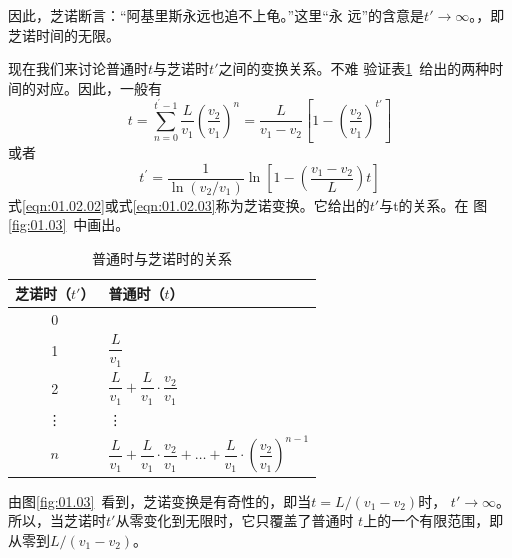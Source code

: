 因此，芝诺断言：“阿基里斯永远也追不上龟。”这里“永
远”的含意是$t'\rightarrow\infty$。，即芝诺时间的无限。

现在我们来讨论普通时$t$与芝诺时$t'$之间的变换关系。不难
验证表\ref{tab:01.02}~给出的两种时间的对应。因此，一般有
{\setlength{\mathindent}{5em}
\begin{equation}
    t=\sum_{n=0}^{t^{\prime}-1} \frac{L}{v_{1}}\left(\frac{v_{2}}{v_{1}}\right)^{n}=\frac{L}{v_{1}-v_{2}}\left[1-\left(\frac{v_{2}}{v_{1}}\right)^{t'}\right]
    \label{eqn:01.02.02}
\end{equation}}%
或者\vspace{-1.2em}
\begin{equation}
    t^{\prime}=\frac{1}{\ln \left(v_{2} / v_{1}\right)} \ln \left[1-\left(\frac{v_{1}-v_{2}}{L}\right) t\right]
    \label{eqn:01.02.03}
\end{equation}%
式\eqref{eqn:01.02.02}或式\eqref{eqn:01.02.03}称为芝诺变换。它给出的$t'$与t的关系。在
图\ref{fig:01.03}~中画出。

\begin{table}[!h]
    \renewcommand\arraystretch{1.6}
    \centering
    \vspace{-0.5em}
    \caption{普通时与芝诺时的关系}
    \label{tab:01.02}
    \begin{tabular}{c|l}
        \toprule
        芝诺时（$t'$） & \hspace{7em}普通时（$t$）                                                                                                         \\
        \midrule
        0              & \qquad 0                                                                                                                          \\
        1              & \qquad $\dfrac{L}{v_1}$                                                                                                           \\
        2              & \qquad $\dfrac{L}{v_1} + \dfrac{L}{v_1}\cdot\dfrac{v_2}{v_1}$                                                                     \\
        \vdots         & \qquad \vdots                                                                                                                     \\
        $n$            & \qquad $\dfrac{L}{v_1} + \dfrac{L}{v_1}\cdot\dfrac{v_2}{v_1} + \dots + \dfrac{L}{v_1}\cdot(\dfrac{v_2}{v_1})^{n-1} $ \qquad \null \\
        \bottomrule
    \end{tabular}
    \vspace{-1.2em}
\end{table}
由图\ref{fig:01.03}~看到，芝诺变换是有奇性的，即当$t=L/(v_1-v_2)$时，
$t'\rightarrow\infty$。所以，当芝诺时$t'$从零变化到无限时，它只覆盖了普通时
$t$上的一个有限范围，即从零到$ L/(v_1-v_2) $。

